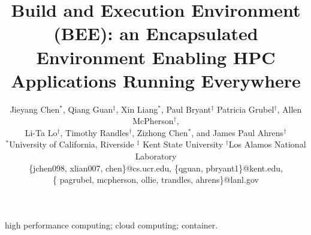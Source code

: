 \documentclass[conference]{IEEEtran}
\begin{document}
\title{Build and Execution Environment (BEE):
an Encapsulated Environment Enabling
HPC Applications Running Everywhere}



\author{Jieyang Chen$^{*}$, Qiang Guan$^{\ddag}$, Xin Liang$^{*}$, Paul  Bryant$^{\ddag}$ Patricia Grubel$^{\dag}$, Allen McPherson$^{\dag}$,\\
  Li-Ta Lo$^{\dag}$,   
Timothy Randles$^{\dag}$, Zizhong Chen$^{*}$, and James Paul Ahrens$^{\dag}$ \\
$^{*}$University of California, Riverside 
$^{\ddagger}$ Kent State University 
$^{\dag}$Los Alamos National Laboratory \\
\{jchen098, xlian007, chen\}@cs.ucr.edu, 
\{qguan, pbryant1\}@kent.edu, \\
\{ pagrubel, mcpherson, ollie, trandles, ahrens\}@lanl.gov
}


\maketitle

\linespread{0.97}%
\selectfont

\begin{abstract}

\end{abstract}





\begin{IEEEkeywords}
high performance computing; cloud computing; container.
\end{IEEEkeywords}
















%
 
\end{document}
